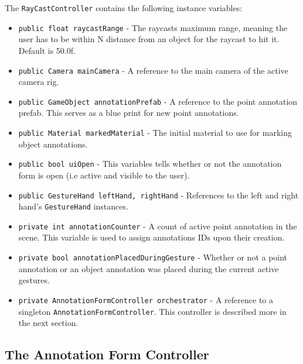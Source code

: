 The \texttt{RayCastController} contains the following instance variables:
\begin{itemize}
\item \texttt{public float raycastRange} - The raycasts maximum range, meaning the user has to be within N distance from an object for the raycast to hit it. Default is 50.0f.                             
\item \texttt{public Camera mainCamera} - A reference to the main camera of the active camera rig.                                       
\item \texttt{public GameObject annotationPrefab} - A reference to the point annotation prefab. This serves as a blue print for new point annotations.
\item \texttt{public Material markedMaterial} - The initial material to use for marking object annotations.
\item \texttt{public bool uiOpen} - This variables tells whether or not the annotation form is open (i.e active and visible to the user).
\item \texttt{public GestureHand leftHand, rightHand} - References to the left and right hand's \texttt{GestureHand} instances.
\item \texttt{private int annotationCounter} - A count of active point annotation in the scene. This variable is used to assign annotations IDs upon their creation.
\item \texttt{private bool annotationPlacedDuringGesture} - Whether or not a point annotation or an object annotation was placed during the current active gestures. 
\item \texttt{private AnnotationFormController orchestrator} - A reference to a singleton \texttt{AnnotationFormController}. This controller is described more in the next section.
\end{itemize}




\subsection{The Annotation Form Controller}
